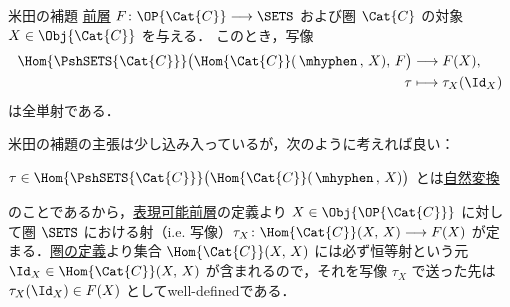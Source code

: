 \documentclass[TQFT_main]{subfiles}
\begin{document}
\begin{mylem}[label=lem:Yoneda]{米田の補題}
    \hyperref[def:presheaf-general]{前層} $F \colon \OP{\Cat{C}} \lto \SETS$ および圏 $\Cat{C}$ の対象 $X \in \Obj{\Cat{C}}$ を与える．
    このとき，写像
    \begin{align}
        \Hom{\PshSETS{\Cat{C}}}\bigl( \Hom{\Cat{C}}(\, \mhyphen\,,\, X),\, F \bigr) &\lto F(X), \\
        \tau &\lmto \tau_X(\Id_X)
    \end{align}
    は全単射である．
\end{mylem}

米田の補題の主張は少し込み入っているが，次のように考えれば良い：

$\tau \in \Hom{\PshSETS{\Cat{C}}}\bigl( \Hom{\Cat{C}}(\, \mhyphen\,,\, X)\bigr)$ とは\hyperref[def:nat]{自然変換}
\begin{center}
\end{center}
のことであるから，\hyperref[def:representable]{表現可能前層}の定義より $X \in \Obj{\OP{\Cat{C}}}$ に対して圏 $\SETS$ における射（i.e. 写像）$\tau_X \colon \Hom{\Cat{C}}(X,\, X) \lto F(X)$ が定まる．\hyperref[def:category]{圏の定義}より集合 $\Hom{\Cat{C}}(X,\, X)$ には必ず恒等射という元 $\Id_X \in \Hom{\Cat{C}}(X,\, X)$ が含まれるので，それを写像 $\tau_X$ で送った先は $\tau_X(\Id_X) \in F(X)$ としてwell-definedである．
\end{document}
